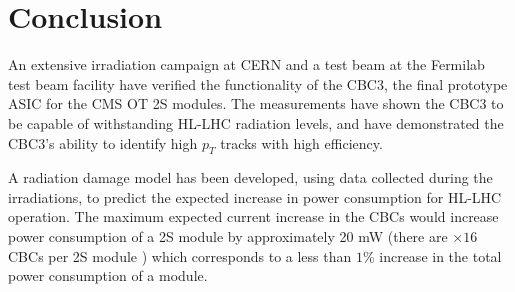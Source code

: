 \section{Conclusion}
An extensive irradiation campaign at CERN and a test beam at the Fermilab test beam facility have verified the functionality of the CBC3, the final prototype ASIC for the CMS OT 2S modules. The measurements have shown the CBC3 to be capable of withstanding HL-LHC radiation levels, and have demonstrated the CBC3's ability to identify high ${p_T}$ tracks with high efficiency. 

A radiation damage model has been developed, using data collected during the irradiations, to predict the expected increase in power consumption for HL-LHC operation. The maximum expected current increase in the CBCs would increase power consumption of a 2S module by approximately 20 mW (there are ${\times16}$ CBCs per 2S module ) which corresponds to a less than ${1}$\% increase in the total power consumption of a module.

